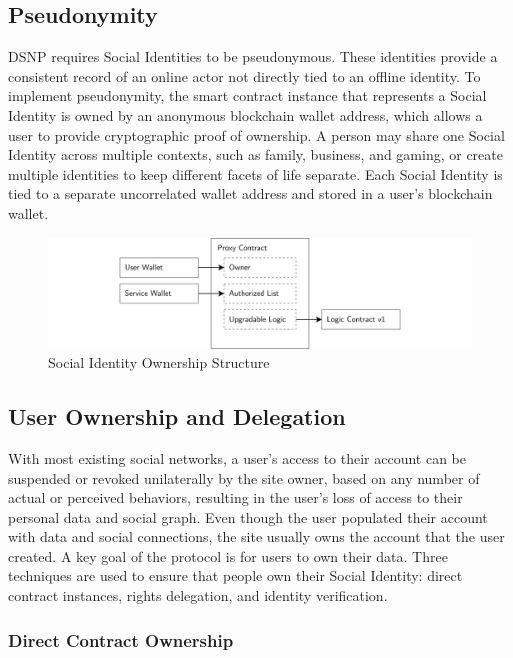 \documentclass[12pt,letterpaper]{article}
\begin{document}
\subsection{Pseudonymity}\label{sec:pseudonymity}

DSNP requires Social Identities to be pseudonymous. These identities provide a consistent
record of an online actor not directly tied to an offline identity. To implement
pseudonymity, the smart contract instance that represents a Social Identity is owned by an
anonymous blockchain wallet address, which allows a user to provide cryptographic proof of
ownership. A person may share one Social Identity across multiple contexts, such as
family, business, and gaming, or create multiple identities to keep different facets of
life separate. Each Social Identity is tied to a separate uncorrelated wallet address and
stored in a user's blockchain wallet.

\begin{figure}
	\includegraphics[width=\linewidth]{figures/Social Identity Ownership Structure.png}
	\caption{Social Identity Ownership Structure}
	\label{fig:1}
\end{figure}

\subsection{User Ownership and Delegation}\label{sec:user_ownership and_delegation}

With most existing social networks, a user's access to their account can be suspended or
revoked unilaterally by the site owner, based on any number of actual or perceived
behaviors, resulting in the user's loss of access to their personal data and social graph.
Even though the user populated their account with data and social connections, the site
usually owns the account that the user created. A key goal of the protocol is for users to
own their data. Three techniques are used to ensure that people own their Social Identity:
direct contract instances, rights delegation, and identity verification.

\subsubsection{Direct Contract Ownership}
\end{document}
